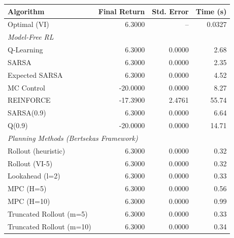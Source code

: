 \begin{tabular}{lrrr}
\toprule
Algorithm & Final Return & Std. Error & Time (s) \\
\midrule
Optimal (VI) & 6.3000 & -- & 0.0327 \\
\midrule
\multicolumn{4}{l}{\textit{Model-Free RL}} \\
Q-Learning & 6.3000 & 0.0000 & 2.68 \\
SARSA & 6.3000 & 0.0000 & 2.35 \\
Expected SARSA & 6.3000 & 0.0000 & 4.52 \\
MC Control & -20.0000 & 0.0000 & 8.27 \\
REINFORCE & -17.3900 & 2.4761 & 55.74 \\
SARSA(0.9) & 6.3000 & 0.0000 & 6.64 \\
Q(0.9) & -20.0000 & 0.0000 & 14.71 \\
\midrule
\multicolumn{4}{l}{\textit{Planning Methods (Bertsekas Framework)}} \\
Rollout (heuristic) & 6.3000 & 0.0000 & 0.32 \\
Rollout (VI-5) & 6.3000 & 0.0000 & 0.32 \\
Lookahead (l=2) & 6.3000 & 0.0000 & 0.33 \\
MPC (H=5) & 6.3000 & 0.0000 & 0.56 \\
MPC (H=10) & 6.3000 & 0.0000 & 0.99 \\
Truncated Rollout (m=5) & 6.3000 & 0.0000 & 0.33 \\
Truncated Rollout (m=10) & 6.3000 & 0.0000 & 0.34 \\
\bottomrule
\end{tabular}
